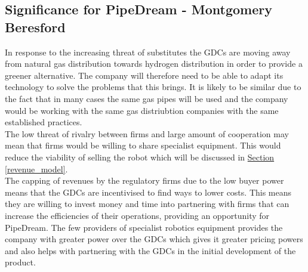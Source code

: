 \documentclass[11pt]{article}		%
\newcommand{\sectref}[1]{\hyperref[#1]{Section \ref*{#1}}}     %
\begin{document}
                
                
            
               \subsection[Significance for PipeDream]{Significance for PipeDream - Montgomery Beresford}
                In response to the increasing threat of substitutes the GDCs are moving away from natural gas distribution towards hydrogen distribution in order to provide a greener alternative. The company will therefore need to be able to adapt its technology to solve the problems that this brings. It is likely to be similar due to the fact that in many cases the same gas pipes will be used and the company would be working with the same gas distriubtion companies with the same established practices.
                \\
                The low threat of rivalry between firms and large amount of cooperation may mean that firms would be willing to share specialist equipment. This would  reduce the viability of selling the robot which will be discussed in \sectref{revenue_model}. 
                \\
                The capping of revenues by the regulatory firms due to the low buyer power means that the GDCs are incentivised to find ways to lower costs. This means they are willing to invest money and time into partnering with firms that can increase the efficiencies of their operations, providing an opportunity for PipeDream.
                The few providers of specialist robotics equipment provides the company with greater power over the GDCs which gives it greater pricing powers and also helps with partnering with the GDCs in the initial development of the product.
\end{document}
